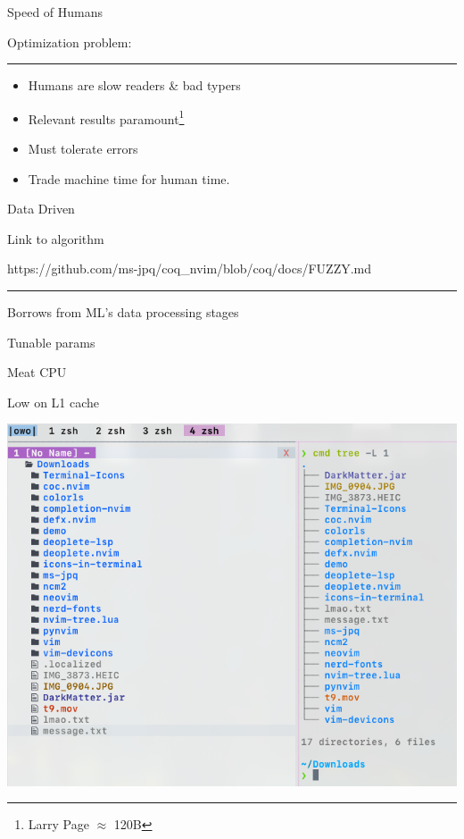 \documentclass{beamer}
\begin{document}
\begin{frame}{Speed of Humans}

	Optimization problem:

	\rule{\textwidth}{0.1em}

	\begin{itemize}

		\item Humans are slow readers \& bad typers

		\item Relevant results paramount\footnote{Larry Page $\approx$ 120B}

		\item Must tolerate errors

		\item Trade machine time for human time.

	\end{itemize}

\end{frame}


\begin{frame}{Data Driven}

	Link to algorithm

	https://github.com/ms-jpq/coq\_nvim/blob/coq/docs/FUZZY.md

	\rule{\textwidth}{0.1em}

	Borrows from ML's data processing stages

	Tunable params

\end{frame}


\begin{frame}{Meat CPU}

	Low on L1 cache

	\includegraphics[width=\textwidth]{chadtree_ls}

\end{frame}
\end{document}
